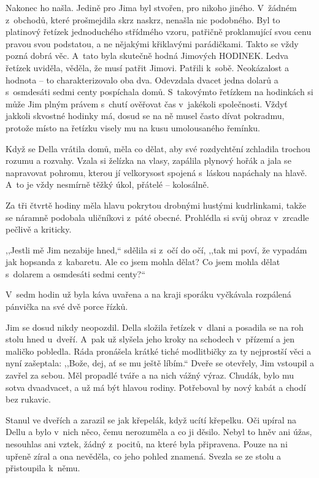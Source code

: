 Nakonec ho našla. Jedině pro Jima byl stvořen, pro nikoho jiného. V žádném z obchodů, které prošmejdila skrz naskrz, nenašla nic podobného. Byl to platinový řetízek jednoduchého střídmého vzoru, patřičně proklamující svou cenu pravou svou podstatou, a ne nějakými křiklavými parádičkami. Takto se vždy pozná dobrá věc. A~tato byla skutečně hodná Jimových HODINEK. Ledva řetízek uviděla, věděla, že musí patřit Jimovi. Patřili k sobě. Neokázalost a hodnota -- to charakterizovalo oba dva. Odevzdala dvacet jedna dolarů a s osmdesáti sedmi centy pospíchala domů. S takovýmto řetízkem na hodinkách si může Jim plným právem s chutí ověřovat čas v jakékoli společnosti. Vždyť jakkoli skvostné hodinky má, dosud se na ně musel často dívat pokradmu, protože místo na řetízku visely mu na kusu umolousaného řemínku.

Když se Della vrátila domů, měla co dělat, aby své rozdychtění zchladila trochou rozumu a rozvahy. Vzala si želízka na vlasy, zapálila plynový hořák a jala se napravovat pohromu, kterou jí velkorysost spojená s láskou napáchaly na hlavě. A~to je vždy nesmírně těžký úkol, přátelé -- kolosálně.

Za tři čtvrtě hodiny měla hlavu pokrytou drobnými hustými kudrlinkami, takže se náramně podobala uličníkovi z páté obecné. Prohlédla si svůj obraz v zrcadle pečlivě a kriticky.

,,Jestli mě Jim nezabije hned,`` sdělila si z očí do očí, ,,tak mi poví, že vypadám jak hopsanda z kabaretu. Ale co jsem mohla dělat? Co jsem mohla dělat s dolarem a osmdesáti sedmi centy?``

V sedm hodin už byla káva uvařena a na kraji sporáku vyčkávala rozpálená pánvička na své dvě porce řízků.

Jim se dosud nikdy neopozdil. Della složila řetízek v dlani a posadila se na roh stolu hned u~dveří. A~pak už slyšela jeho kroky na schodech v přízemí a jen maličko pobledla. Ráda pronášela krátké tiché modlitbičky za ty nejprostší věci a nyní zašeptala: ,,Bože, dej, ať se mu ještě líbím.``
Dveře se otevřely, Jim vstoupil a zavřel za sebou. Měl propadlé tváře a na nich vážný výraz. Chudák, bylo mu sotva dvaadvacet, a už má být hlavou rodiny. Potřeboval by nový kabát a chodí bez rukavic.

Stanul ve dveřích a zarazil se jak křepelák, když ucítí křepelku. Oči upíral na Dellu a bylo v nich něco, čemu nerozuměla a co ji děsilo. Nebyl to hněv ani úžas, nesouhlas ani vztek, žádný z pocitů, na které byla připravena. Pouze na ni upřeně zíral a ona nevěděla, co jeho pohled znamená.
Svezla se ze stolu a přistoupila k němu.

